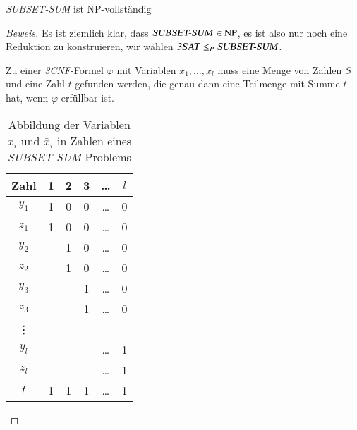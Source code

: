 \begin{satz}\textsl{SUBSET-SUM} ist NP-vollständig
\end{satz}

\begin{proof}[Beweis]
Es ist ziemlich klar, dass $\text{\textsl{SUBSET-SUM}}\in\operatorname{NP}$,
es ist also nur noch eine Reduktion zu konstruieren, wir wählen
$\text{\textsl{3SAT}}\le_P\text{\textsl{SUBSET-SUM}}$.

Zu einer \textsl{3CNF}-Formel $\varphi$ mit Variablen $x_1,\dots,x_l$
muss eine Menge von Zahlen $S$ und eine Zahl $t$ gefunden werden,
die genau dann eine Teilmenge mit Summe $t$ hat, wenn $\varphi$
erfüllbar ist.

\begin{table}
\begin{center}
\begin{tabular}{|c|ccccc|}
\hline
Zahl&1&2&3&\dots&$l$\\
\hline
$y_1$&1&0&0&\dots&0\\
$z_1$&1&0&0&\dots&0\\
$y_2$& &1&0&\dots&0\\
$z_2$& &1&0&\dots&0\\
$y_3$& & &1&\dots&0\\
$z_3$& & &1&\dots&0\\
\vdots&& & &     & \\
$y_l$& & & &\dots&1\\
$z_l$& & & &\dots&1\\
\hline
$t$&1&1&1&\dots&1\\
\hline
\end{tabular}
\end{center}
\caption{Abbildung der Variablen $x_i$ und $\bar x_i$ in Zahlen
eines \textsl{SUBSET-SUM}-Problems\label{subsetsumnumbers}}
\end{table}


\end{proof}
